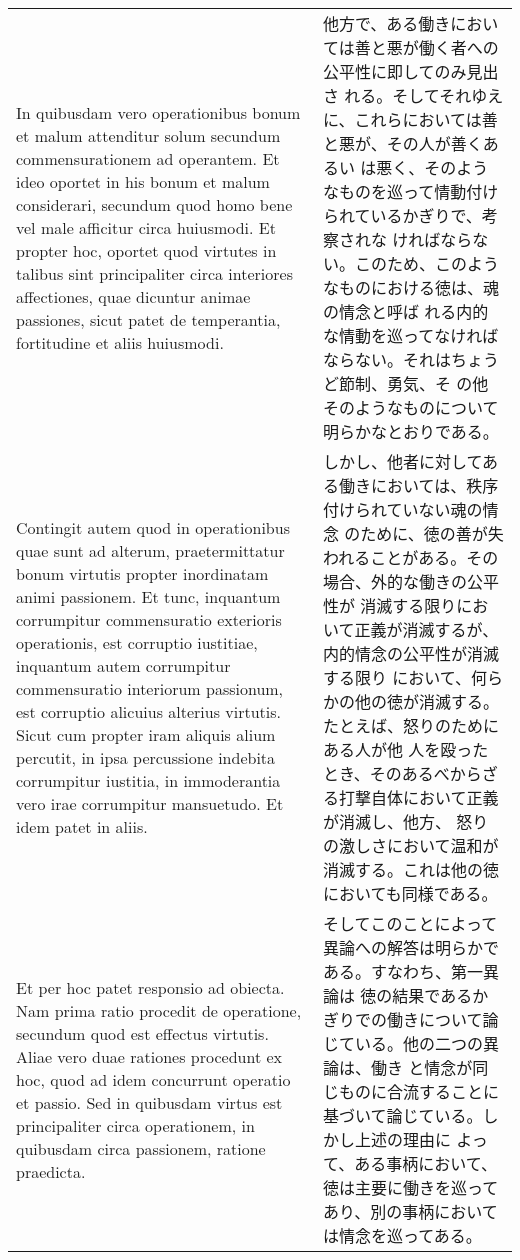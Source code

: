 \documentclass[10pt]{jsarticle}
\begin{document}
\begin{longtable}{p{21em}p{21em}}
 
\\

 In quibusdam vero operationibus bonum et malum attenditur solum
 secundum commensurationem ad operantem. Et ideo oportet in his bonum
 et malum considerari, secundum quod homo bene vel male afficitur
 circa huiusmodi. Et propter hoc, oportet quod virtutes in talibus
 sint principaliter circa interiores affectiones, quae dicuntur animae
 passiones, sicut patet de temperantia, fortitudine et aliis
 huiusmodi.

&

 他方で、ある働きにおいては善と悪が働く者への公平性に即してのみ見出さ
 れる。そしてそれゆえに、これらにおいては善と悪が、その人が善くあるい
 は悪く、そのようなものを巡って情動付けられているかぎりで、考察されな
 ければならない。このため、このようなものにおける徳は、魂の情念と呼ば
 れる内的な情動を巡ってなければならない。それはちょうど節制、勇気、そ
 の他そのようなものについて明らかなとおりである。

 
\\

 Contingit autem quod in operationibus quae sunt ad alterum,
 praetermittatur bonum virtutis propter inordinatam animi
 passionem. Et tunc, inquantum corrumpitur commensuratio exterioris
 operationis, est corruptio iustitiae, inquantum autem corrumpitur
 commensuratio interiorum passionum, est corruptio alicuius alterius
 virtutis. Sicut cum propter iram aliquis alium percutit, in ipsa
 percussione indebita corrumpitur iustitia, in immoderantia vero irae
 corrumpitur mansuetudo. Et idem patet in aliis.

 &

 しかし、他者に対してある働きにおいては、秩序付けられていない魂の情念
 のために、徳の善が失われることがある。その場合、外的な働きの公平性が
 消滅する限りにおいて正義が消滅するが、内的情念の公平性が消滅する限り
 において、何らかの他の徳が消滅する。たとえば、怒りのためにある人が他
 人を殴ったとき、そのあるべからざる打撃自体において正義が消滅し、他方、
 怒りの激しさにおいて温和が消滅する。これは他の徳においても同様である。

 
\\



 Et per hoc patet responsio ad obiecta. Nam prima ratio procedit de
 operatione, secundum quod est effectus virtutis. Aliae vero duae
 rationes procedunt ex hoc, quod ad idem concurrunt operatio et
 passio. Sed in quibusdam virtus est principaliter circa operationem,
 in quibusdam circa passionem, ratione praedicta.

 &

そしてこのことによって異論への解答は明らかである。すなわち、第一異論は
徳の結果であるかぎりでの働きについて論じている。他の二つの異論は、働き
と情念が同じものに合流することに基づいて論じている。しかし上述の理由に
よって、ある事柄において、徳は主要に働きを巡ってあり、別の事柄において
は情念を巡ってある。
 

\end{longtable}
\newpage
\end{document}
